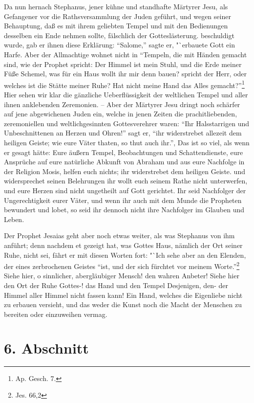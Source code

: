 Da nun hernach Stephanus, jener kühne und standhafte Märtyrer Jesu, als
Gefangener vor die Rathsversammlung der Juden geführt, und wegen seiner
Behauptung, daß es mit ihrem geliebten Tempel und mit den Bedienungen desselben
ein Ende nehmen sollte, fälschlich der Gotteslästerung. beschuldigt wurde, gab
er ihnen diese Erklärung: "`Salome,"' sagte er, "`erbauete Gott ein Harfe. Aber
der Allmachtige wohnet nicht in "`Tempeln, die mit Händen gemacht sind, wie der
Prophet spricht: Der Himmel ist mein Stuhl, und die Erde meiner Füße Schemel,
was für ein Haus wollt ihr mir denn bauen? spricht der Herr, oder welches ist
die Stätte meiner Ruhe? Hat nicht meine Hand das Alles gemacht?"'\footnote{Ap.
Gesch. 7.} Hier sehen wir klar die gänzliche Ueberflüssigkeit der weltlichen
Tempel und aller ihnen anklebenden Zeremonien. -- Aber der Märtyrer Jesu dringt
noch schärfer auf jene abgewichenen Juden ein, welche in jenen Zeiten die
prachitliebenden, zeremoniellen und weltlichgesinnten Gottesverehrer waren:
"`Ihr Halsstarrigen und Unbeschnittenen an Herzen und Ohren!"' sagt er, "`ihr
widerstrebet allezeit dem heiligen Geiste; wie eure Väter thaten, so thut auch
ihr."', Das ist so viel, als wenn er gesagt hätte: Eure äußern Tempel,
Beobachtungen und Schattendienste, eure Ansprüche auf eure natürliche Abkunft
von Abraham  und aus eure Nachfolge in der Religion Mosis, helfen euch nichts;
ihr widerstrebet dem heiligen Geiste. und widersprechet seinen Belehrungen ihr
wollt euch seinem Rathe nicht unterwerfen, und eure Herzen sind nicht ungetheilt
auf Gott gerichtet. Ihr seid Nachfolger der Ungerechtigkeit eurer Väter, und
wenn ihr auch mit dem Munde die Propheten bewundert und lobet, so seid ihr
dennoch nicht ihre Nachfolger im Glauben und Leben.

\medskip

Der Prophet Jesaias geht aber noch etwas weiter, als was Stephanus von ihm
anführt; denn nachdem et gezeigt hat, was Gottes Haus, nämlich der Ort seiner
Ruhe, nicht sei, fährt er mit diesen Worten fort: "`Ich sehe aber an den
Elenden, der eines zerbrochenen Geistes "`ist, und der sich fürchtet vor meinem
Worte."'\footnote{Jes. 66,2} Siehe hier, o sinnlicher, abergläubiger Mensch! den
wahren Anbeter! Siehe hier den Ort der Ruhe Gottes-! das Hand und den Tempel
Desjenigen, den- der Himmel aller Himmel nicht fassen kann! Ein Hand, welches
die Eigenliebe nicht zu erbauen versieht, und das weder die Kunst noch die Macht
der Menschen zu bereiten oder einzuweihen vermag.

\section{6. Abschnitt} \label{kap5_ab6}

